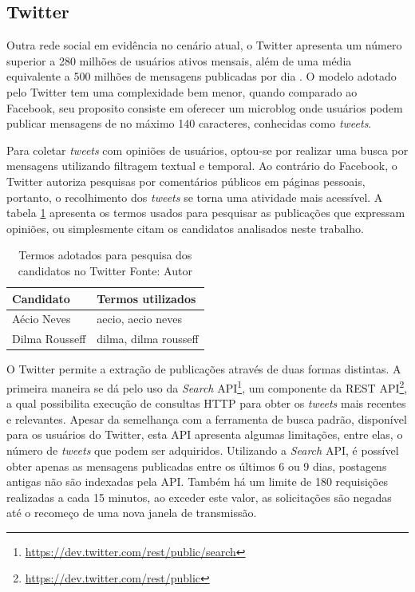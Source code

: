 \subsection{Twitter}

Outra rede social em evidência no cenário atual, o Twitter apresenta um número superior a 280 milhões de usuários ativos mensais, além de uma média equivalente a 500 milhões de mensagens publicadas por dia \cite{twitter-doc}. O modelo adotado pelo Twitter tem uma complexidade bem menor, quando comparado ao Facebook, seu proposito consiste em oferecer um microblog onde usuários podem publicar mensagens de no máximo 140 caracteres, conhecidas como \textit{tweets}.

Para coletar \textit{tweets} com opiniões de usuários, optou-se por realizar uma busca por mensagens utilizando filtragem textual e temporal. Ao contrário do Facebook, o Twitter autoriza pesquisas por comentários públicos em páginas pessoais, portanto, o recolhimento dos \textit{tweets} se torna uma atividade mais acessível. A tabela \ref{tab-tw-nomes} apresenta os termos usados para pesquisar as publicações que expressam opiniões, ou simplesmente citam os candidatos analisados neste trabalho.

\begin{table}[!ht]
\begin{center}
  \begin{tabular}{|p{5cm}|p{5cm}|}
	\hline
	Candidato & Termos utilizados
	\\ \hline
	Aécio Neves & aecio, aecio neves
	\\ \hline
	Dilma Rousseff & dilma, dilma rousseff
	\\ \hline
  \end{tabular}
  \captionsetup{justification=centering}
  \caption[Termos adotados para pesquisa dos candidatos no Twitter]{Termos adotados para pesquisa dos candidatos no Twitter
  \protect\linebreak Fonte: Autor}
\label{tab-tw-nomes}
\end{center}
\end{table}
\FloatBarrier

O Twitter permite a extração de publicações através de duas formas distintas. A primeira maneira se dá pelo uso da \textit{Search} API\footnote{\url{https://dev.twitter.com/rest/public/search}}, um componente da REST API\footnote{\url{https://dev.twitter.com/rest/public}}, a qual possibilita execução de consultas HTTP para obter os \textit{tweets} mais recentes e relevantes. Apesar da semelhança com a ferramenta de busca padrão, disponível para os usuários do Twitter, esta API apresenta algumas limitações, entre elas, o número de \textit{tweets} que podem ser adquiridos. Utilizando a \textit{Search} API, é possível obter apenas as mensagens publicadas entre os últimos 6 ou 9 dias, postagens antigas não são indexadas pela API. Também há um limite de 180 requisições realizadas a cada 15 minutos, ao exceder este valor, as solicitações são negadas até o recomeço de uma nova janela de transmissão.

